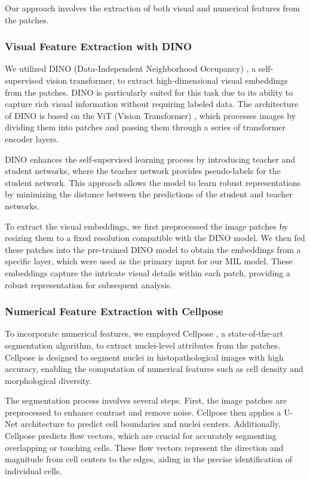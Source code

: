 \documentclass[10pt,twocolumn]{article}
\begin{document}
Our approach involves the extraction of both visual and numerical features from the patches.

\subsubsection{Visual Feature Extraction with DINO}

We utilized DINO (Data-Independent Neighborhood Occupancy) \cite{caron2021emerging}, a self-supervised vision transformer, to extract high-dimensional visual embeddings from the patches. DINO is particularly suited for this task due to its ability to capture rich visual information without requiring labeled data. The architecture of DINO is based on the ViT (Vision Transformer) \cite{dosovitskiy2020image}, which processes images by dividing them into patches and passing them through a series of transformer encoder layers. 

DINO enhances the self-supervised learning process by introducing teacher and student networks, where the teacher network provides pseudo-labels for the student network. This approach allows the model to learn robust representations by minimizing the distance between the predictions of the student and teacher networks. 

To extract the visual embeddings, we first preprocessed the image patches by resizing them to a fixed resolution compatible with the DINO model. We then fed these patches into the pre-trained DINO model to obtain the embeddings from a specific layer, which were used as the primary input for our MIL model. These embeddings capture the intricate visual details within each patch, providing a robust representation for subsequent analysis.

\subsubsection{Numerical Feature Extraction with Cellpose}

To incorporate numerical features, we employed Cellpose \cite{stringer2021cellpose}, a state-of-the-art segmentation algorithm, to extract nuclei-level attributes from the patches. Cellpose is designed to segment nuclei in histopathological images with high accuracy, enabling the computation of numerical features such as cell density and morphological diversity.

The segmentation process involves several steps. First, the image patches are preprocessed to enhance contrast and remove noise. Cellpose then applies a U-Net architecture \cite{ronneberger2015u} to predict cell boundaries and nuclei centers. Additionally, Cellpose predicts flow vectors, which are crucial for accurately segmenting overlapping or touching cells. These flow vectors represent the direction and magnitude from cell centers to the edges, aiding in the precise identification of individual cells.
\end{document}
